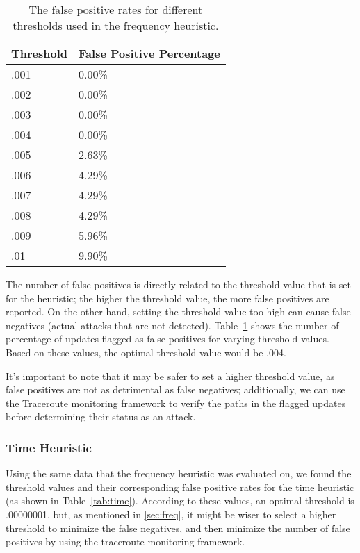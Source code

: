 \begin{table}[h]
\begin{center}
    \begin{tabular}{| l | l |}
    \hline
    Threshold & False Positive Percentage \\ \hline \hline
    .001 & 0.00\% \\ \hline
    .002 & 0.00\% \\ \hline
    .003 & 0.00\% \\ \hline
    .004 & 0.00\% \\ \hline
    .005 & 2.63\% \\ \hline
    .006 & 4.29\% \\ \hline
    .007 & 4.29\% \\ \hline
    .008 & 4.29\% \\ \hline
    .009 & 5.96\% \\ \hline
    .01 & 9.90\% \\
    \hline
    \end{tabular}
\end{center}
\caption{The false positive rates for different thresholds used in the frequency heuristic.}
\label{tab:frequency}
\end{table}

The number of false positives is directly related to the threshold value that is set for the heuristic; the higher the threshold value, the more false positives are reported.  On the other hand, setting the threshold value too high can cause false negatives (actual attacks that are not detected).  Table~\ref{tab:frequency} shows the number of percentage of updates flagged as false positives for varying threshold values.  Based on these values, the optimal threshold value would be .004.  

It's important to note that it may be safer to set a higher threshold value, as false positives are not as detrimental as false negatives; additionally, we can use the Traceroute monitoring framework to verify the paths in the flagged updates before determining their status as an attack.  

\subsubsection{Time Heuristic}

Using the same data that the frequency heuristic was evaluated on, we found the threshold values and their corresponding false positive rates for the time heuristic (as shown in Table~\ref{tab:time}).  According to these values, an optimal threshold is .00000001, but, as mentioned in \ref{sec:freq}, it might be wiser to select a higher threshold to minimize the false negatives, and then minimize the number of false positives by using the traceroute monitoring framework.

